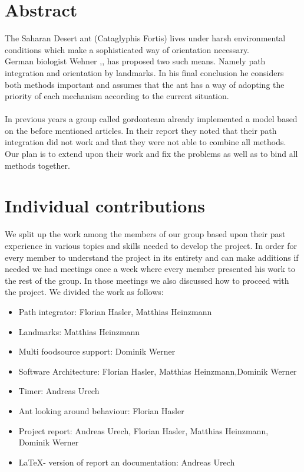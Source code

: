 \documentclass[11pt]{article}
\begin{document}



\tableofcontents

\newpage


\section{Abstract}
The Saharan Desert ant (Cataglyphis Fortis) lives under harsh environmental conditions which make a sophisticated way of orientation necessary.\\
German biologist Wehner \cite{Wehner2003},\cite{Wehner1988}, \cite{Wehner1998} has proposed two such means. Namely path integration and orientation by landmarks.
In his final conclusion he considers both methods important and assumes that the ant has a way of adopting the priority of each mechanism according to the current situation.\\
\ \\
 In previous years a group called gordonteam\cite{GordonTeam2008} already implemented a model based on the before mentioned articles. In their report they noted that their path integration did not work and that they were not able to combine all methods. Our plan is to extend upon their work and fix the problems as well as to bind all methods together. 

\newpage
\section{Individual contributions}
We split up the work among the members of our group based upon their past experience in various topics and skills needed to develop the project. 
In order for every member to understand the project in its entirety and can make additions if needed we had meetings once a week where every member presented his work to the rest of the group. In those meetings we also discussed how to proceed with the project.
We divided the work as follows:
\begin{itemize}
\item Path integrator: Florian Hasler, Matthias Heinzmann
\item Landmarks: Matthias Heinzmann
\item Multi foodsource support: Dominik Werner
\item Software Architecture: Florian Hasler, Matthias Heinzmann,Dominik Werner
\item Timer: Andreas Urech
\item Ant looking around behaviour: Florian Hasler
\item Project report: Andreas Urech, Florian Hasler, Matthias Heinzmann, Dominik Werner
\item \LaTeX - version of report an documentation: Andreas Urech
\end{itemize}
\end{document}
